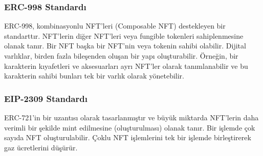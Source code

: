 \subsubsection{ERC-998 Standardı}

ERC-998, kombinasyonlu NFT'leri (Composable NFT) destekleyen bir standarttır. NFT'lerin diğer NFT'leri veya fungible tokenleri sahiplenmesine olanak tanır. Bir NFT başka bir NFT'nin veya tokenin sahibi olabilir. Dijital varlıklar, birden fazla bileşenden oluşan bir yapı oluşturabilir. Örneğin, bir karakterin kıyafetleri ve aksesuarları ayrı NFT'ler olarak tanımlanabilir ve bu karakterin sahibi bunları tek bir varlık olarak yönetebilir.

\subsubsection{EIP-2309 Standardı}

ERC-721'in bir uzantısı olarak tasarlanmıştır ve büyük miktarda NFT'lerin daha verimli bir şekilde mint edilmesine (oluşturulması) olanak tanır. Bir işlemde çok sayıda NFT oluşturulabilir. Çoklu NFT işlemlerini tek bir işlemde birleştirerek gaz ücretlerini düşürür. 

\newpage